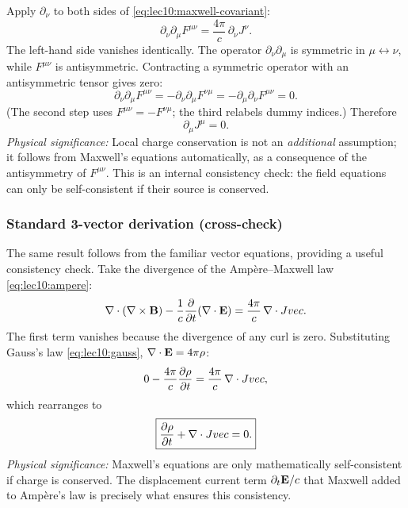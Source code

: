 Apply $\partial_\nu$ to both sides of \eqref{eq:lec10:maxwell-covariant}:
\begin{equation}\label{eq:lec10:dnu-maxwell}
  \partial_\nu\partial_\mu F^{\mu\nu}
  =
  \frac{4\pi}{c}\,\partial_\nu J^\nu .
\end{equation}
The left-hand side vanishes identically.  The operator $\partial_\nu\partial_\mu$ is symmetric in
$\mu\leftrightarrow\nu$, while $F^{\mu\nu}$ is antisymmetric.  Contracting a symmetric operator with
an antisymmetric tensor gives zero:
\begin{equation}\label{eq:lec10:sym-anti}
  \partial_\nu\partial_\mu F^{\mu\nu}
  =
  -\partial_\nu\partial_\mu F^{\nu\mu}
  =
  -\partial_\mu\partial_\nu F^{\mu\nu}
  = 0 .
\end{equation}
(The second step uses $F^{\mu\nu}=-F^{\nu\mu}$; the third relabels dummy indices.)  Therefore
\begin{equation}\label{eq:lec10:continuity}
  \boxed{
  \partial_\mu J^\mu = 0 .
  }
\end{equation}
\textit{Physical significance:} Local charge conservation is not an \emph{additional} assumption; it
follows from Maxwell's equations automatically, as a consequence of the antisymmetry of $F^{\mu\nu}$.
This is an internal consistency check: the field equations can only be self-consistent if their source
is conserved.

\subsubsection*{Standard 3-vector derivation (cross-check)}

The same result follows from the familiar vector equations, providing a useful consistency check.
Take the divergence of the Ampère--Maxwell law \eqref{eq:lec10:ampere}:
\begin{equation}\label{eq:lec10:div-ampere}
  \nabla\cdot(\nabla\times\mathbf{B})
  - \frac{1}{c}\frac{\partial}{\partial t}(\nabla\cdot\mathbf{E})
  =
  \frac{4\pi}{c}\,\nabla\cdot\\Jvec .
\end{equation}
The first term vanishes because the divergence of any curl is zero.  Substituting Gauss's law
\eqref{eq:lec10:gauss}, $\nabla\cdot\mathbf{E}=4\pi\rho$:
\begin{equation}\label{eq:lec10:continuity-3vec}
  0 - \frac{4\pi}{c}\frac{\partial\rho}{\partial t}
  =
  \frac{4\pi}{c}\,\nabla\cdot\\Jvec,
\end{equation}
which rearranges to
\begin{equation}\label{eq:lec10:continuity-3vec-final}
  \boxed{
  \frac{\partial\rho}{\partial t} + \nabla\cdot\\Jvec = 0 .
  }
\end{equation}
\textit{Physical significance:} Maxwell's equations are only mathematically self-consistent if charge
is conserved.  The displacement current term $\partial_t\mathbf{E}/c$ that Maxwell added to Ampère's law is
precisely what ensures this consistency.

